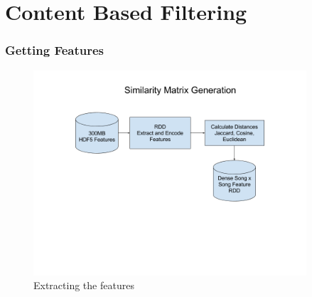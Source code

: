 \documentclass[11pt]{beamer}
\begin{document}
  \section{Content Based Filtering}
  \begin{frame}
    \frametitle{Getting Features}
    \begin{figure}[h]
      \centering
      \includegraphics[width=4in]{figures/similarity_matrix.png}
      \caption{Extracting the features}
      \label{fig:similarity_matrix}
    \end{figure}
  \end{frame}
\end{document}
